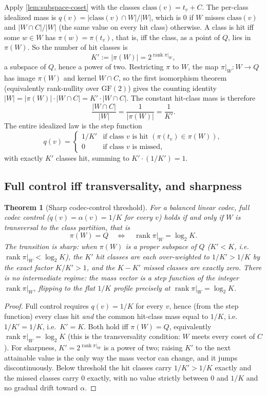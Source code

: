 \documentclass[11pt]{article}
\theoremstyle{definition}
\theoremstyle{plain}
\newtheorem{theorem}{Theorem}[section]
\theoremstyle{remark}
\newcommand{\GF}{\mathrm{GF}(2)}
\newcommand{\class}{\mathrm{class}}
\DeclareMathOperator{\rank}{rank}
\newcommand{\W}{W}                          %
\newcommand{\proj}{\pi}                     %
\newcommand{\Quot}{Q}                       %
\newcommand{\al}{\alpha}                    %
\newcommand{\inter}{\cap}
\begin{document}
Apply \cref{lem:subspace-coset} with the classes $\class(v) = t_v + C$. The per-class
idealized mass is $q(v) = |\class(v) \inter \W| / |\W|$, which is $0$ if $\W$ misses
$\class(v)$ and $|\W \inter C| / |\W|$ (the same value on every hit class) otherwise. A
class is hit iff some $w \in \W$ has $\proj(w) = \proj(t_v)$, that is, iff the class,
as a point of $\Quot$, lies in $\proj(\W)$. So the number of hit classes is
\[
  K' := |\proj(\W)| = 2^{\rank \proj|_{\W}},
\]
a subspace of $\Quot$, hence a power of two. Restricting $\proj$ to $\W$, the map
$\proj|_{\W} : \W \to \Quot$ has image $\proj(\W)$ and kernel $\W \inter C$, so the
first isomorphism theorem (equivalently rank-nullity over $\GF$) gives the counting
identity $|\W| = |\proj(\W)| \cdot |\W \inter C| = K' \cdot |\W \inter C|$. The constant
hit-class mass is therefore
\[
  \frac{|\W \inter C|}{|\W|} = \frac{1}{|\proj(\W)|} = \frac{1}{K'}.
\]
The entire idealized law is the step function
\[
  q(v) =
  \begin{cases}
    1/K' & \text{if class } v \text{ is hit } (\proj(t_v) \in \proj(\W)), \\
    0 & \text{if class } v \text{ is missed},
  \end{cases}
\]
with exactly $K'$ classes hit, summing to $K' \cdot (1/K') = 1$.

\subsection{Full control iff transversality, and sharpness}

\begin{theorem}[Sharp codec-control threshold]
\label{thm:threshold}
For a balanced linear codec, full codec control ($q(v) = \al(v) = 1/K$ for every $v$)
holds if and only if $\W$ is transversal to the class partition, that is
\[
  \proj(\W) = \Quot \quad\Longleftrightarrow\quad \rank \proj|_{\W} = \log_2 K.
\]
The transition is sharp: when $\proj(\W)$ is a proper subspace of $\Quot$ ($K' < K$,
i.e.\ $\rank \proj|_{\W} < \log_2 K$), the $K'$ hit classes are each over-weighted to
$1/K' > 1/K$ by the exact factor $K/K' > 1$, and the $K - K'$ missed classes are
exactly zero. There is no intermediate regime: the mass vector is a step function of
the integer $\rank \proj|_{\W}$, flipping to the flat $1/K$ profile precisely at
$\rank \proj|_{\W} = \log_2 K$.
\end{theorem}

\begin{proof}
Full control requires $q(v) = 1/K$ for every $v$, hence (from the step function) every
class hit \emph{and} the common hit-class mass equal to $1/K$, i.e.\ $1/K' = 1/K$, i.e.\
$K' = K$. Both hold iff $\proj(\W) = \Quot$, equivalently $\rank \proj|_{\W} = \log_2 K$
(this is the transversality condition: $\W$ meets every coset of $C$). For sharpness,
$K' = 2^{\rank \proj|_{\W}}$ is a power of two; raising $K'$ to the next attainable
value is the only way the mass vector can change, and it jumps discontinuously. Below
threshold the hit classes carry $1/K' > 1/K$ exactly and the missed classes carry $0$
exactly, with no value strictly between $0$ and $1/K$ and no gradual drift toward
$\al$.
\end{proof}
\end{document}
